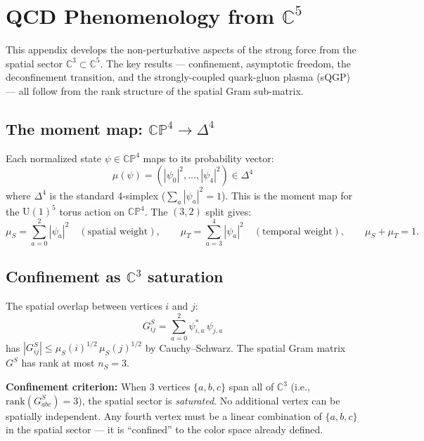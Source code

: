 \section{QCD Phenomenology from $\mathbb{C}^5$}
\label{app:qcd}

This appendix develops the non-perturbative aspects of the strong force from the spatial sector $\mathbb{C}^3 \subset \mathbb{C}^5$. The key results --- confinement, asymptotic freedom, the deconfinement transition, and the strongly-coupled quark-gluon plasma (sQGP) --- all follow from the rank structure of the spatial Gram sub-matrix.

\subsection{The moment map: $\mathbb{CP}^4 \to \Delta^4$}

Each normalized state $\psi \in \mathbb{CP}^4$ maps to its probability vector:
\begin{equation}
\mu(\psi) = (|\psi_0|^2, \ldots, |\psi_4|^2) \in \Delta^4
\end{equation}
where $\Delta^4$ is the standard 4-simplex ($\sum_a |\psi_a|^2 = 1$). This is the moment map for the $\text{U}(1)^5$ torus action on $\mathbb{CP}^4$. The $(3,2)$ split gives:
\begin{equation}
\mu_S = \sum_{a=0}^{2}|\psi_a|^2 \quad (\text{spatial weight}), \qquad \mu_T = \sum_{a=3}^{4}|\psi_a|^2 \quad (\text{temporal weight}), \qquad \mu_S + \mu_T = 1.
\end{equation}

\subsection{Confinement as $\mathbb{C}^3$ saturation}

The spatial overlap between vertices $i$ and $j$:
\begin{equation}
G^S_{ij} = \sum_{a=0}^{2} \psi^*_{i,a}\,\psi_{j,a}
\end{equation}
has $|G^S_{ij}| \leq \mu_S(i)^{1/2}\,\mu_S(j)^{1/2}$ by Cauchy--Schwarz. The spatial Gram matrix $G^S$ has rank at most $n_S = 3$.

\textbf{Confinement criterion:} When 3 vertices $\{a, b, c\}$ span all of $\mathbb{C}^3$ (i.e., $\text{rank}(G^S_{abc}) = 3$), the spatial sector is \emph{saturated}. No additional vertex can be spatially independent. Any fourth vertex must be a linear combination of $\{a, b, c\}$ in the spatial sector --- it is ``confined'' to the color space already defined.

